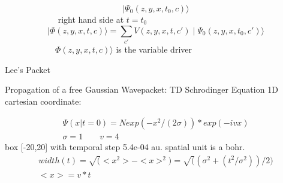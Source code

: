 \documentclass{article}
\def \>{\rangle}
\begin{document}
 \begin{equation}
     \mid \Psi_{0}(z,y,x,t_{0},c) \>
 \end{equation}
  $\quad \quad \quad \quad \quad \quad $ right hand side at $t=t_{0}$
 \begin{equation}
     \mid \Phi(z,y,x,t,c) \> = \sum_{c'} V(z,y,x,t,c')
                                \mid \Psi_{0}(z,y,x,t_{0},c')\> 
 \end{equation}
 $ \quad \quad \quad \quad \quad \quad \Phi(z,y,x,t,c) \> 
                      $ is the variable driver
 \par
 \center Lee's Packet
 \par
 \center Propagation of a free Gaussian Wavepacket: TD Schrodinger Equation
 \center 1D cartesian coordinate:
\par
\begin{eqnarray}
 & \Psi(x|t=0) = N exp(-x^2/(2 \sigma))*exp(-ivx) & \nonumber \\
 & \sigma = 1 \quad \quad  v = 4 &
 \end{eqnarray}
 box [-20,20] with temporal step 5.4e-04 au. spatial unit is a bohr.
 \begin{eqnarray}
  & width(t) = \sqrt(<x^2> - <x>^2)
              = \sqrt((\sigma^2 + (t^2/\sigma^2))/2) & \nonumber \\
 & <x> = v*t &
 \end{eqnarray}
\end{document}
